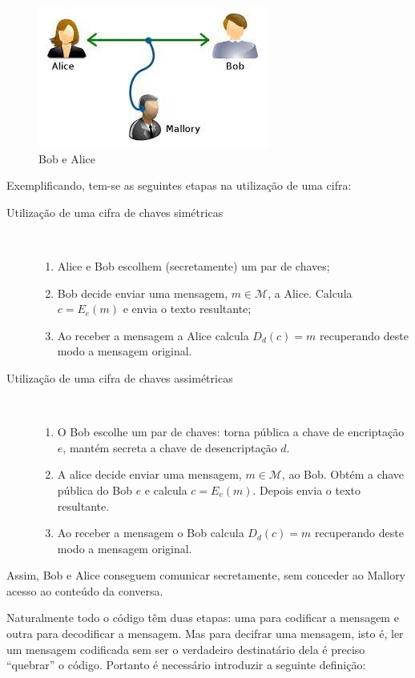 \begin{figure}[h]
    \centering
    \includegraphics[scale=0.5]{Figs/bobalice.jpg}
    \caption{Bob e Alice}
    \label{fig:bobalice}
\end{figure}
Exemplificando, tem-se as seguintes etapas na utilização de uma cifra:
\begin{description}
    \item[Utilização de uma cifra de chaves simétricas] {\ }
    \begin{enumerate}
        \item Alice e Bob escolhem (secretamente) um par de chaves;
        \item Bob decide enviar uma mensagem, $m \in \mathcal{M}$, a Alice. Calcula $c=E_e(m)$ e envia o texto resultante;
        \item Ao receber a mensagem a Alice calcula $D_d(c)=m$ recuperando deste modo a mensagem original.
    \end{enumerate}
    \item[Utilização de uma cifra de chaves assimétricas] {\ }
    \begin{enumerate}
        \item O Bob escolhe um par de chaves: torna pública a chave de encriptação $e$, mantém secreta a chave de desencriptação $d$.
        \item A alice decide enviar uma mensagem, $m \in \mathcal{M}$, ao Bob. Obtém a chave pública do Bob $e$ e calcula $c=E_e(m)$. Depois envia o texto resultante.
        \item Ao receber a mensagem o Bob calcula $D_d(c)=m$ recuperando deste modo a mensagem original.
    \end{enumerate}
\end{description}

Assim, Bob e Alice conseguem comunicar secretamente, sem conceder ao Mallory acesso ao conteúdo da conversa.

Naturalmente todo o código têm duas etapas: uma para codificar a mensagem e outra para decodificar a mensagem. Mas para decifrar uma mensagem, isto é, ler um mensagem codificada sem ser o verdadeiro destinatário dela é preciso ``quebrar'' o código. Portanto é necessário introduzir a seguinte definição:

